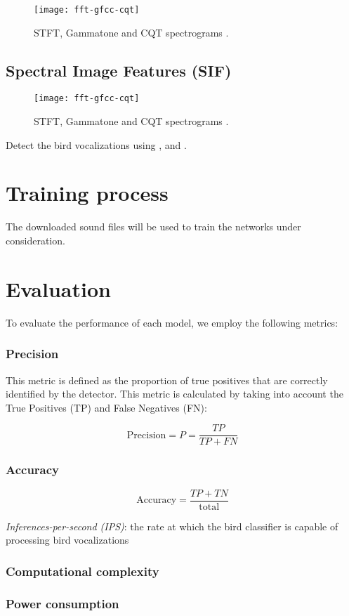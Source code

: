 \begin{figure}[H]
\centering
\texttt{[image: fft-gfcc-cqt]}
\caption{STFT, Gammatone and CQT spectrograms \citep{Xie2017}.}
\end{figure}

\FloatBarrier

\subsection{Spectral Image Features (SIF)}

\begin{figure}[h]
\centering
\texttt{[image: fft-gfcc-cqt]}
\caption{STFT, Gammatone and CQT spectrograms \citep{Xie2017}.}
\end{figure}


Detect the bird vocalizations using \cite{Fodor2013}, \cite{Lasseck2015} and \cite{Potamitis2015}.



\section{Training process}

The downloaded sound files will be used to train the networks under consideration.

\section{Evaluation}


To evaluate the performance of each model, we employ the following metrics:

\subsubsection{Precision}

This metric is defined as the proportion of true positives that are correctly identified by the detector. 
This metric is calculated by taking into account the True Positives (TP) and False Negatives (FN):

\[
\mathrm{Precision} = P = \frac{TP}{TP + FN}
\]

\subsubsection{Accuracy}

\[
\mathrm{Accuracy} = \frac{TP+TN}{\mathrm{total}}
\]


\par{\textit{Inferences-per-second (IPS)}}: the rate at which the bird classifier is capable of processing bird vocalizations

\subsubsection{Computational complexity}


\subsubsection{Power consumption}

